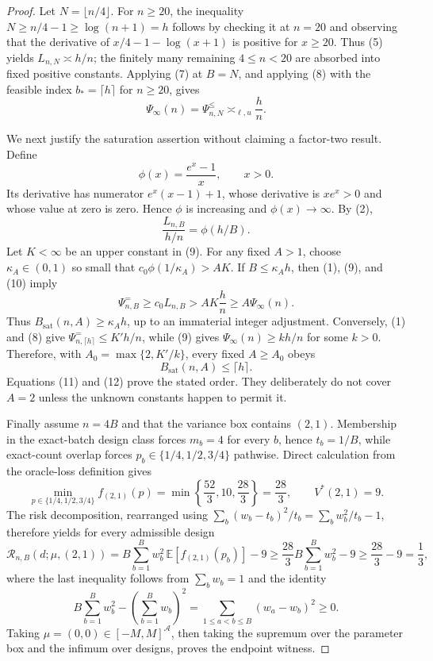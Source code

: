 \documentclass{article}
\begin{document}
\begin{proof}
Let \(N=\lfloor n/4\rfloor\). For \(n\geq20\), the inequality \(N\geq n/4-1\geq\log(n+1)=h\) follows by checking it at \(n=20\) and observing that the derivative of \(x/4-1-\log(x+1)\) is positive for \(x\geq20\). Thus (5) yields \(L_{n,N}\asymp h/n\); the finitely many remaining \(4\leq n<20\) are absorbed into fixed positive constants. Applying (7) at \(B=N\), and applying (8) with the feasible index \(b_*=\lceil h\rceil\) for \(n\geq20\), gives
\[
\Psi_\infty(n)=\Psi^{\leq}_{n,N}\asymp_{\ell,u}\frac{h}{n}. \tag{9}
\]

We next justify the saturation assertion without claiming a factor-two result. Define
\[
\phi(x)=\frac{e^x-1}{x},\qquad x>0.
\]
Its derivative has numerator \(e^x(x-1)+1\), whose derivative is \(xe^x>0\) and whose value at zero is zero. Hence \(\phi\) is increasing and \(\phi(x)\to\infty\). By (2),
\[
\frac{L_{n,B}}{h/n}=\phi(h/B).                    \tag{10}
\]
Let \(K<\infty\) be an upper constant in (9). For any fixed \(A>1\), choose \(\kappa_A\in(0,1)\) so small that
\(c_0\phi(1/\kappa_A)>AK\). If \(B\leq\kappa_Ah\), then (1), (9), and (10) imply
\[
\Psi^{=}_{n,B}\geq c_0L_{n,B}>AK\frac{h}{n}\geq A\Psi_\infty(n). \tag{11}
\]
Thus \(B_{\mathrm{sat}}(n,A)\geq\kappa_Ah\), up to an immaterial integer adjustment. Conversely, (1) and (8) give
\(\Psi^{=}_{n,\lceil h\rceil}\leq K'h/n\), while (9) gives
\(\Psi_\infty(n)\geq kh/n\) for some \(k>0\). Therefore, with
\(A_0=\max\{2,K'/k\}\), every fixed \(A\geq A_0\) obeys
\[
B_{\mathrm{sat}}(n,A)\leq\lceil h\rceil.          \tag{12}
\]
Equations (11) and (12) prove the stated order. They deliberately do not cover \(A=2\) unless the unknown constants happen to permit it.

Finally assume \(n=4B\) and that the variance box contains \((2,1)\). Membership in the exact-batch design class forces \(m_b=4\) for every \(b\), hence \(t_b=1/B\), while exact-count overlap forces \(p_b\in\{1/4,1/2,3/4\}\) pathwise. Direct calculation from the oracle-loss definition gives
\[
\min_{p\in\{1/4,1/2,3/4\}} f_{(2,1)}(p)
=\min\left\{\frac{52}{3},10,\frac{28}{3}\right\}
=\frac{28}{3},
\qquad V^*(2,1)=9.                                \tag{13}
\]
The risk decomposition, rearranged using
\(\sum_b(w_b-t_b)^2/t_b=\sum_bw_b^2/t_b-1\), therefore yields for every admissible design
\[
\mathcal R_{n,B}(d;\mu,(2,1))
=B\sum_{b=1}^Bw_b^2\,
  \mathbb E[f_{(2,1)}(p_b)]-9
\geq\frac{28}{3}B\sum_{b=1}^Bw_b^2-9
\geq\frac{28}{3}-9=\frac13,                       \tag{14}
\]
where the last inequality follows from \(\sum_bw_b=1\) and the identity
\[
B\sum_{b=1}^Bw_b^2-\left(\sum_{b=1}^Bw_b\right)^2
=\sum_{1\leq a<b\leq B}(w_a-w_b)^2\geq0.
\]
Taking \(\mu=(0,0)\in[-M,M]^{\mathcal A}\), then taking the supremum over the parameter box and the infimum over designs, proves the endpoint witness.
\end{proof}
\end{document}
